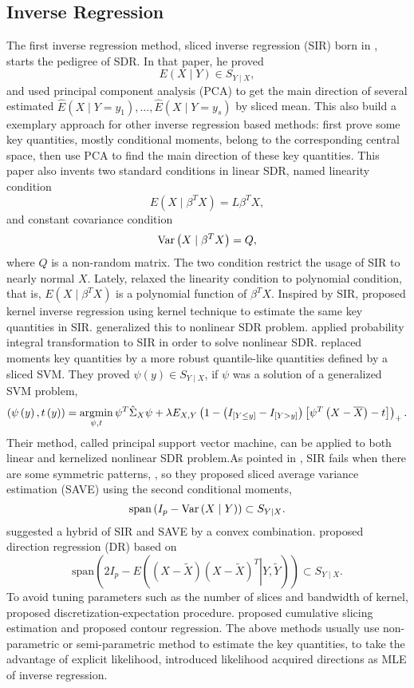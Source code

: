 \subsection{Inverse Regression }

The first inverse regression method, sliced inverse regression (SIR)
born in \citet{li1991sliced}, starts the pedigree of SDR. In that
paper, he proved 
\[
E\left(X\mid Y\right)\in S_{Y\mid X},
\]
and used principal component analysis (PCA) to get the main direction
of several estimated $\hat{E}\left(X\mid Y=y_{1}\right),\ldots,\hat{E}\left(X\mid Y=y_{s}\right)$
by sliced mean. This also build a exemplary approach for other inverse
regression based methods: first prove some key quantities, mostly
conditional moments, belong to the corresponding central space, then
use PCA to find the main direction of these key quantities. This paper
also invents two standard conditions in linear SDR, named linearity
condition 
\[
E\left(X\mid\beta^{T}X\right)=L\beta^{T}X,
\]
and constant covariance condition 
\[
\mathrm{Var}\left(X\mid\beta^{T}X\right)=Q,
\]
where $Q$ is a non-random matrix. The two condition restrict the
usage of SIR to nearly normal $X$. Lately, \citet{dong2010dimension}
relaxed the linearity condition to polynomial condition, that is,
$E\left(X\mid\beta^{T}X\right)$ is a polynomial function of $\beta^{T}X$.
Inspired by SIR, \citet{zhu1996asymptotics} proposed kernel inverse
regression using kernel technique to estimate the same key quantities
in SIR. \citet{wu2008kernel} generalized this to nonlinear SDR problem.
\citet{wang2014transformed} applied probability integral transformation
to SIR in order to solve nonlinear SDR. \citet{li2011principal} replaced
moments key quantities by a more robust quantile-like quantities defined
by a sliced SVM. They proved $\psi\left(y\right)\in S_{Y\mid X}$,
if $\psi$ was a solution of a generalized SVM problem, 
\[
\left(\psi\left(y\right),t\left(y\right)\right)=\operatorname*{\arg\!\min}_{\psi,t}\psi^{T}\hat{\Sigma}_{X}\psi+\lambda E_{X,Y}\left(1-\left(I_{\left[Y\le y\right]}-I_{\left[Y>y\right]}\right)\left[\psi^{T}\left(X-\overline{X}\right)-t\right]\right)_{+}.
\]
Their method, called principal support vector machine, can be applied
to both linear and kernelized nonlinear SDR problem.As pointed in
\citet{1991}, SIR fails when there are some symmetric patterns, ,
so they proposed sliced average variance estimation (SAVE) using the
second conditional moments, 
\[
\mathrm{span}\left(I_{p}-\mathrm{Var}\left(X\mid Y\right)\right)\subset S_{Y\mid X}.
\]
\citet{zhu2007hybrid} suggested a hybrid of SIR and SAVE by a convex
combination. \citet{li2007directional} proposed direction regression
(DR) based on 
\[
\mathrm{span}\left(2I_{p}-E\left(\left.\left(X-\tilde{X}\right)\left(X-\tilde{X}\right)^{T}\right|Y,\tilde{Y}\right)\right)\subset S_{Y\mid X}.
\]
To avoid tuning parameters such as the number of slices and bandwidth
of kernel, \citet{zhu2010sufficient} proposed discretization-expectation
procedure. \citet{zhu2010dimension} proposed cumulative slicing estimation
and \citet{li2005contour} proposed contour regression. The above
methods usually use non-parametric or semi-parametric method to estimate
the key quantities, to take the advantage of explicit likelihood,
\citet{cook2009likelihood} introduced likelihood acquired directions
as MLE of inverse regression. 

